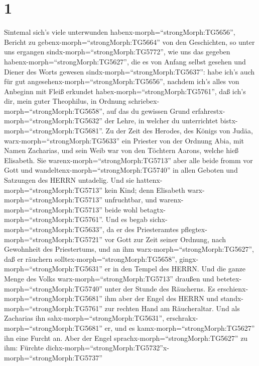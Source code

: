 \hypertarget{section}{%
\section{1}\label{section}}

 Sintemal sich's viele unterwunden
habenx-morph=``strongMorph:TG5656'', Bericht zu
gebenx-morph=``strongMorph:TG5664'' von den Geschichten, so unter uns
ergangen sindx-morph=``strongMorph:TG5772'',  wie uns das
gegeben habenx-morph=``strongMorph:TG5627'', die es von Anfang selbst
gesehen und Diener des Worts gewesen sindx-morph=``strongMorph:TG5637'':
 habe ich's auch für gut
angesehenx-morph=``strongMorph:TG5656'', nachdem ich's alles von
Anbeginn mit Fleiß erkundet habex-morph=``strongMorph:TG5761'', daß
ich's dir, mein guter Theophilus, in Ordnung
schriebex-morph=``strongMorph:TG5658'',  auf das du gewissen
Grund erfahrestx-morph=``strongMorph:TG5632'' der Lehre, in welcher du
unterrichtet bistx-morph=``strongMorph:TG5681''.  Zu der
Zeit des Herodes, des Königs von Judäa,
warx-morph=``strongMorph:TG5633'' ein Priester von der Ordnung Abia, mit
Namen Zacharias, und sein Weib war von den Töchtern Aarons, welche hieß
Elisabeth.  Sie warenx-morph=``strongMorph:TG5713'' aber
alle beide fromm vor Gott und wandeltenx-morph=``strongMorph:TG5740'' in
allen Geboten und Satzungen des HERRN untadelig.  Und sie
hattenx-morph=``strongMorph:TG5713'' kein Kind; denn Elisabeth
warx-morph=``strongMorph:TG5713'' unfruchtbar, und
warenx-morph=``strongMorph:TG5713'' beide wohl
betagtx-morph=``strongMorph:TG5761''.  Und es begab
sichx-morph=``strongMorph:TG5633'', da er des Priesteramtes
pflegtex-morph=``strongMorph:TG5721'' vor Gott zur Zeit seiner Ordnung,
 nach Gewohnheit des Priestertums, und an ihm
warx-morph=``strongMorph:TG5627'', daß er räuchern
solltex-morph=``strongMorph:TG5658'', gingx-morph=``strongMorph:TG5631''
er in den Tempel des HERRN.  Und die ganze Menge des Volks
warx-morph=``strongMorph:TG5713'' draußen und
betetex-morph=``strongMorph:TG5740'' unter der Stunde des Räucherns.
 Es erschienx-morph=``strongMorph:TG5681'' ihm aber der
Engel des HERRN und standx-morph=``strongMorph:TG5761'' zur rechten Hand
am Räucheraltar.  Und als Zacharias ihn
sahx-morph=``strongMorph:TG5631'',
erschrakx-morph=``strongMorph:TG5681'' er, und es
kamx-morph=``strongMorph:TG5627'' ihn eine Furcht an.  Aber
der Engel sprachx-morph=``strongMorph:TG5627'' zu ihm: Fürchte
dichx-morph=``strongMorph:TG5732''\textbar x-morph=``strongMorph:TG5737''
